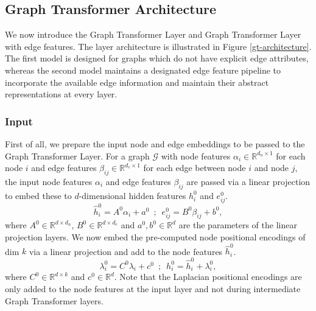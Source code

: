 \documentclass[letterpaper]{article} %
\begin{document}
\subsection{Graph Transformer Architecture}
We now introduce the Graph Transformer Layer and Graph Transformer Layer with edge features. The layer architecture is illustrated in Figure \ref{gt-architecture}. The first model is designed for graphs which do not have explicit edge attributes, whereas the second model maintains a designated edge feature pipeline to incorporate the available edge information and maintain their abstract representations at every layer.

\subsubsection{Input} First of all, we prepare the input node and edge embeddings to be passed to the Graph Transformer Layer. For a graph $\mathcal{G}$ with node features $\alpha_i \in \mathbb{R}^{d_n \times 1}$ for each node $i$ and edge features $\beta_{ij} \in \mathbb{R}^{d_e \times 1}$ for each edge between node $i$ and node $j$, the input node features $\alpha_i$ and edge features $\beta_{ij}$ are passed via a linear projection to embed these to $d$-dimensional hidden features $h_i^{0}$ and $e_{ij}^{0}$.
\begin{equation}
    \label{eqn:input_embd}
    \hat{h}_i^{0} = A^{0} \alpha_i + a^{0} \;\ ; \;\ e_{ij}^{0} = B^{0} \beta_{ij} + b^{0} ,
\end{equation}
where $A^{0} \in \mathbb{R}^{d \times d_n}$, $B^{0} \in \mathbb{R}^{d \times d_e}$ and $a^{0},b^{0}\in \mathbb{R}^{d}$
are the parameters of the linear projection layers.
We now embed the pre-computed node positional encodings of dim $k$ via a linear projection and add to the node features $\hat{h}_i^{0}$.
\begin{equation}
\label{eqn:pe_embd_add}
{\lambda}_i^{0} = C^{0} \lambda_i + c^{0} \;\  ; \;\ h_i^{0} = \hat{h}_i^{0} + {\lambda}_i^{0},
\end{equation}
where $C^{0} \in \mathbb{R}^{d \times k}$ and $c^{0}\in \mathbb{R}^{d}$. Note that the Laplacian positional encodings are only added to the node features at the input layer and not during intermediate Graph Transformer layers.
\end{document}
